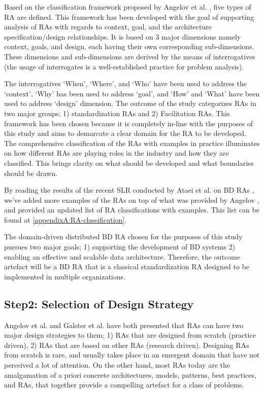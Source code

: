 \documentclass[review]{elsarticle}
\begin{document}
Based on the classification framework proposed by Angelov et al. \cite{angelov2009classification}, five types of RA are defined. This framework has been developed with the goal of supporting analysis of RAs with regards to context, goal, and the architecture specification/design relationships. It is based on 3 major dimensions namely context, goals, and design, each having their own corresponding sub-dimensions. These dimensions and sub-dimensions are derived by the means of interrogatives (the usage of interrogates is a well-established practice for problem analysis).

The interrogatives ‘When’, ‘Where’, and ‘Who’ have been used to address the ‘context’, ‘Why’ has been used to address ‘goal’, and ‘How’ and ‘What’ have been used to address ‘design’ dimension. The outcome of the study categorizes RAs in two major groups; 1) standardization RAs and 2) Facilitation RAs. This framework has been chosen because it is completely in-line with the purposes of this study and aims to demarcate a clear domain for the RA to be developed. The comprehensive classification of the RAs with examples in practice illuminates on how different RAs are playing roles in the industry and how they are classified. This brings clarity on what should be developed and what boundaries should be drawn.

By reading the results of the recent SLR conducted by Ataei et al. on BD RAs \cite{AtaeiACIS}, we've added more examples of the RAs on top of what was provided by Angelov \cite{angelov2009classification}, and provided an updated list of RA classifications with examples. This list can be found at \ref{appendixA:RA-classification}.

The domain-driven distributed BD RA chosen for the purposes of this study pursues two major goals; 1) supporting the development of BD systems 2) enabling an effective and scalable data architecture. Therefore, the outcome artefact will be a BD RA that is a classical standardization RA designed to be implemented in multiple organizations.

\subsection{Step2: Selection of Design Strategy}

Angelov et al. \cite{angelov2008towards} and Galster et al.\cite{galster2011empirically} have both presented that RAs can have two major design strategies to them; 1) RAs that are designed from scratch (practice driven), 2) RAs that are based on other RAs (research driven). Designing RAs from scratch is rare, and usually takes place in an emergent domain that have not perceived a lot of attention. On the other hand, most RAs today are the amalgamation of a priori concrete architectures, models, patterns, best practices, and RAs, that together provide a compelling artefact for a class of problems.
\end{document}
